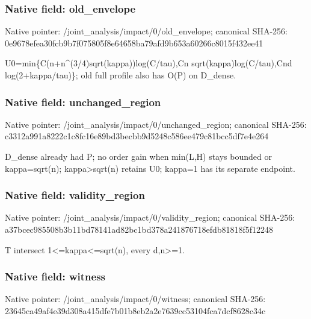 \documentclass[10pt,a4paper]{article}
\begin{document}
\subsubsection{Native field: old\_\allowbreak{}envelope}
Native pointer: /joint\_\allowbreak{}analysis/impact/0/old\_\allowbreak{}envelope; canonical SHA-256: 0e9678efea30fcb9b7f075805f8e64658ba79afd9b653a60266c8015f432ee41

\begingroup\raggedright\sloppy U0=\allowbreak{}min\{C(n+n\textasciicircum{}(3/\allowbreak{}4)sqrt(kappa))log(C/\allowbreak{}tau),\allowbreak{}Cn sqrt(kappa)log(C/\allowbreak{}tau),\allowbreak{}Cnd log(2+kappa/\allowbreak{}tau)\};\allowbreak{} old full profile also has O(P) on D\_\allowbreak{}dense.\par\endgroup

\subsubsection{Native field: unchanged\_\allowbreak{}region}
Native pointer: /joint\_\allowbreak{}analysis/impact/0/unchanged\_\allowbreak{}region; canonical SHA-256: c3312a991a8222c1c8fc16e89bd3becbb9d5248c586ee479c81bcc5df7e4e264

\begingroup\raggedright\sloppy D\_\allowbreak{}dense already had P;\allowbreak{} no order gain when min(L,\allowbreak{}H) stays bounded or kappa=\allowbreak{}sqrt(n);\allowbreak{} kappa>sqrt(n) retains U0;\allowbreak{} kappa=\allowbreak{}1 has its separate endpoint.\par\endgroup

\subsubsection{Native field: validity\_\allowbreak{}region}
Native pointer: /joint\_\allowbreak{}analysis/impact/0/validity\_\allowbreak{}region; canonical SHA-256: a37bcec985508b3b11bd78141ad82bc1bd378a241876718efdb81818f5f12248

\begingroup\raggedright\sloppy T intersect 1<=\allowbreak{}kappa<=\allowbreak{}sqrt(n),\allowbreak{} every d,\allowbreak{}n>=\allowbreak{}1.\par\endgroup

\subsubsection{Native field: witness}
Native pointer: /joint\_\allowbreak{}analysis/impact/0/witness; canonical SHA-256: 23645ca49af4e39d308a415dfe7b01b8eb2a2e7639cc53104fca7dcf8628c34c
\end{document}
